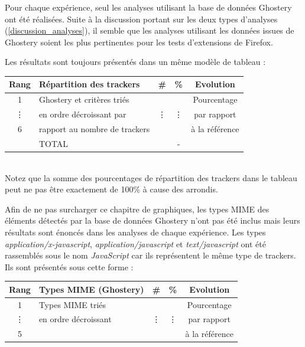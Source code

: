 Pour chaque expérience, seul les analyses utilisant la base de données Ghostery ont été réalisées. Suite à la discussion portant sur les deux types d'analyses (\autoref{discussion_analyses}), il semble que les analyses utilisant les données issues de Ghostery soient les plus pertinentes pour les tests d'extensions de Firefox.
\newline

Les résultats sont toujours présentés dans un même modèle de tableau :\\

\begin{tabular}{ c | p{6cm} | c | c || c | }
   Rang & Répartition des trackers & \# & \% & Evolution \\
   \hline
   \hline
   1 & Ghostery et critères triés &  &  & Pourcentage \\
   \vdots & en ordre décroissant par & \vdots & \vdots & par rapport \\
   6 & rapport au nombre de trackers &  &  & à la référence \\
   \hline
    & TOTAL &  & - & \\
   \hline
\end{tabular}
\\[1cm]
Notez que la somme des pourcentages de répartition des trackers dans le tableau peut ne pas être exactement de 100\% à cause des arrondis.
\newline

Afin de ne pas surcharger ce chapitre de graphiques, les types MIME des éléments détectés par la base de données Ghostery n'ont pas été inclus mais leurs résultats sont énoncés dans les analyses de chaque expérience. Les types \textit{application/x-javascript}, \textit{application/javascript} et \textit{text/javascript} ont été rassemblés sous le nom \textit{JavaScript} car ils représentent le même type de trackers. Ils sont présentés sous cette forme :\\

\begin{tabular}{ c | p{5cm} | c | c | c | }
   Rang & Types MIME (Ghostery) & \# & \% & Evolution\\
   \hline
   \hline
   1 & Types MIME triés &  &  & Pourcentage \\
   \vdots & en ordre décroissant & \vdots & \vdots & par rapport \\
   5 &  &  &  & à la référence \\
   \hline
\end{tabular}
\\[1cm]

